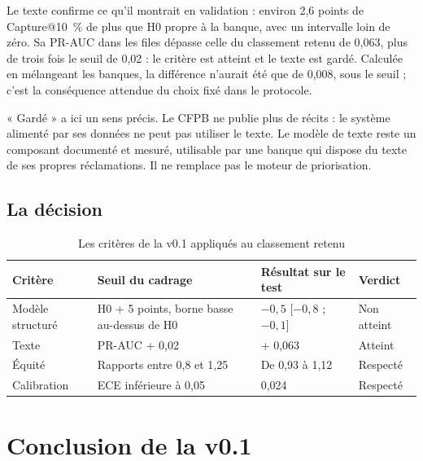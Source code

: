 \documentclass[11pt,a4paper]{article}
\begin{document}
Le texte confirme ce qu'il montrait en validation : environ 2,6 points de Capture@10~\% de plus que H0 propre à la banque, avec un intervalle loin de zéro. Sa PR-AUC dans les files dépasse celle du classement retenu de 0,063, plus de trois fois le seuil de 0,02 : le critère est atteint et le texte est gardé. Calculée en mélangeant les banques, la différence n'aurait été que de 0,008, sous le seuil ; c'est la conséquence attendue du choix fixé dans le protocole.

« Gardé » a ici un sens précis. Le CFPB ne publie plus de récits : le système alimenté par ses données ne peut pas utiliser le texte. Le modèle de texte reste un composant documenté et mesuré, utilisable par une banque qui dispose du texte de ses propres réclamations. Il ne remplace pas le moteur de priorisation.

\subsection{La décision}

\begin{table}[H]
\centering\small
\begin{tabularx}{\linewidth}{@{}l Y l l@{}}
\toprule
Critère & Seuil du cadrage & Résultat sur le test & Verdict \\
\midrule
Modèle structuré & H0 + 5 points, borne basse au-dessus de H0 & $-0{,}5$ [$-0{,}8$ ; $-0{,}1$] & Non atteint \\
Texte & PR-AUC + 0,02 & + 0,063 & Atteint \\
Équité & Rapports entre 0,8 et 1,25 & De 0,93 à 1,12 & Respecté \\
Calibration & ECE inférieure à 0,05 & 0,024 & Respecté \\
\bottomrule
\end{tabularx}
\caption{Les critères de la v0.1 appliqués au classement retenu}
\end{table}


\section{Conclusion de la v0.1}
\end{document}
